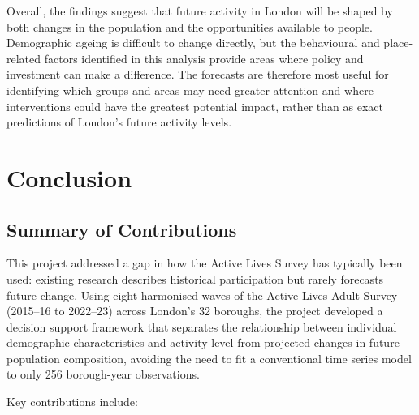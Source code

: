 \documentclass[ %
                    author={Ashrey Ashrey, Sanya Kapoor, Trisha Sharma, Yash Bhooshan Pandloskar},
                supervisor={Dr. Dalila O’Grady},
                    degree={MSc},
                     title={Using machine learning to forecast physical activity participation, volunteering and activity patterns in London},
                  subtitle={},
                      type={},
                      year={2021}]{dissertation}
\begin{document}
Overall, the findings suggest that future activity in London will be shaped by both changes in the population and the opportunities available to people. Demographic ageing is difficult to change directly, but the behavioural and place-related factors identified in this analysis provide areas where policy and investment can make a difference. The forecasts are therefore most useful for identifying which groups and areas may need greater attention and where interventions could have the greatest potential impact, rather than as exact predictions of London's future activity levels.




\chapter{Conclusion}
\label{chap:conclusion}

\section{Summary of Contributions}

This project addressed a gap in how the Active Lives Survey has typically been used: existing research describes historical participation but rarely forecasts future change. Using eight harmonised waves of the Active Lives Adult Survey (2015--16 to 2022--23) across London's 32 boroughs, the project developed a decision support framework that separates the relationship between individual demographic characteristics and activity level from projected changes in future population composition, avoiding the need to fit a conventional time series model to only 256 borough-year observations.

Key contributions include:
\end{document}
